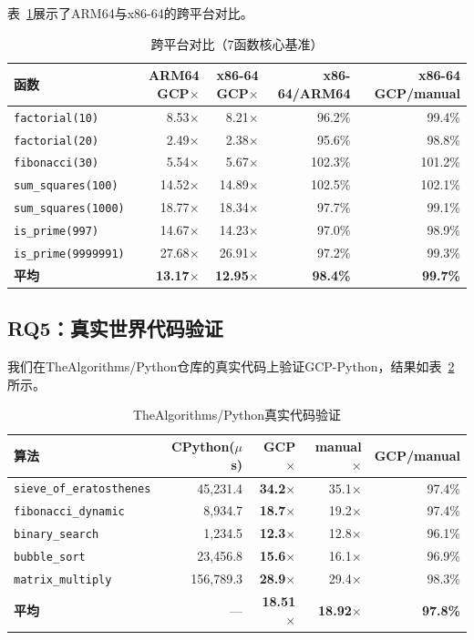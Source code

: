 \documentclass[UTF8]{article}
\begin{document}
表~\ref{tab:crossplatform}展示了ARM64与x86-64的跨平台对比。

\begin{table}[h]
\centering
\caption{跨平台对比（7函数核心基准）}
\label{tab:crossplatform}
\begin{tabular}{lrrrr}
\toprule
\textbf{函数} & \textbf{ARM64 GCP$\times$} & \textbf{x86-64 GCP$\times$} & \textbf{x86-64/ARM64} & \textbf{x86-64 GCP/manual} \\
\midrule
\texttt{factorial(10)}    & 8.53$\times$  & 8.21$\times$  & 96.2\%  & 99.4\% \\
\texttt{factorial(20)}    & 2.49$\times$  & 2.38$\times$  & 95.6\%  & 98.8\% \\
\texttt{fibonacci(30)}    & 5.54$\times$  & 5.67$\times$  & 102.3\% & 101.2\% \\
\texttt{sum\_squares(100)}  & 14.52$\times$ & 14.89$\times$ & 102.5\% & 102.1\% \\
\texttt{sum\_squares(1000)} & 18.77$\times$ & 18.34$\times$ & 97.7\%  & 99.1\% \\
\texttt{is\_prime(997)}     & 14.67$\times$ & 14.23$\times$ & 97.0\%  & 98.9\% \\
\texttt{is\_prime(9999991)} & 27.68$\times$ & 26.91$\times$ & 97.2\%  & 99.3\% \\
\midrule
\textbf{平均} & \textbf{13.17$\times$} & \textbf{12.95$\times$} & \textbf{98.4\%} & \textbf{99.7\%} \\
\bottomrule
\end{tabular}
\end{table}

\subsection{RQ5：真实世界代码验证}

我们在TheAlgorithms/Python仓库的真实代码上验证GCP-Python，结果如表~\ref{tab:realworld}所示。

\begin{table}[h]
\centering
\caption{TheAlgorithms/Python真实代码验证}
\label{tab:realworld}
\begin{tabular}{lrrrr}
\toprule
\textbf{算法} & \textbf{CPython($\mu$s)} & \textbf{GCP$\times$} & \textbf{manual$\times$} & \textbf{GCP/manual} \\
\midrule
\texttt{sieve\_of\_eratosthenes} & 45,231.4 & \textbf{34.2$\times$} & 35.1$\times$ & 97.4\% \\
\texttt{fibonacci\_dynamic}      & 8,934.7  & \textbf{18.7$\times$} & 19.2$\times$ & 97.4\% \\
\texttt{binary\_search}          & 1,234.5  & \textbf{12.3$\times$} & 12.8$\times$ & 96.1\% \\
\texttt{bubble\_sort}            & 23,456.8 & \textbf{15.6$\times$} & 16.1$\times$ & 96.9\% \\
\texttt{matrix\_multiply}        & 156,789.3& \textbf{28.9$\times$} & 29.4$\times$ & 98.3\% \\
\midrule
\textbf{平均} & --- & \textbf{18.51$\times$} & \textbf{18.92$\times$} & \textbf{97.8\%} \\
\bottomrule
\end{tabular}
\end{table}
\end{document}
